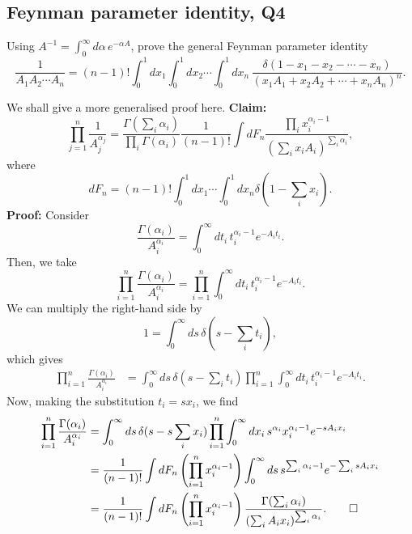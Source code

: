\subsection{Feynman parameter identity, Q4}
Using $A^{-1} = \int_0^\infty d\alpha\,e^{-\alpha A}$, prove the general Feynman parameter identity
\begin{equation}
    \frac{1}{A_1 A_2\cdots A_n} = (n-1)!\int_0^1 dx_1\int_0^1 dx_2\cdots\int_0^1 dx_n\,\frac{\delta(1 - x_1 - x_2 - \cdots - x_n)}{(x_1 A_1 + x_2 A_2 + \cdots + x_n A_n)^n}.
\end{equation}
\begin{solution}
    We shall give a more generalised proof here.
    \noindent\textbf{Claim:}
\begin{equation}
    \prod_{j=1}^n\frac{1}{A_j^{\alpha_j}} = \frac{\Gamma(\sum_i\alpha_i)}{\prod_i\Gamma(\alpha_i)}\frac{1}{(n-1)!}\int dF_n \frac{\prod_ix_i^{\alpha_i-1}}{(\sum_ix_iA_i)^{\sum_i\alpha_i}},
\end{equation}
where
\begin{equation}
    dF_n = (n-1)!\int_0^1dx_1\cdots\int^1_0 dx_n \delta(1-\sum_ix_i).
\end{equation}
\noindent\textbf{Proof:}
Consider
\begin{equation}
    \frac{\Gamma(\alpha_i)}{A_i^{\alpha_i}} = \int_0^\infty dt_i\, t_i^{\alpha_i-1}e^{-A_it_i}.
\end{equation}
Then, we take
\begin{equation}
    \prod_{i=1}^n \frac{\Gamma(\alpha_i)}{A_i^{\alpha_i}} = \prod_{i=1}^n\int_0^\infty dt_i\, t_i^{\alpha_i-1}e^{-A_it_i}.
\end{equation}
We can multiply the right-hand side by
\begin{equation}
    1 = \int^\infty_0ds\,\delta(s-\sum_it_i),
\end{equation}
which gives
\begin{equation}
\begin{aligned}
    \prod_{i=1}^n \frac{\Gamma(\alpha_i)}{A_i^{\alpha_i}} &= \int^\infty_0ds\,\delta(s-\sum_it_i)\prod_{i=1}^n\int_0^\infty dt_i\, t_i^{\alpha_i-1}e^{-A_it_i}.
\end{aligned}
\end{equation}
Now, making the substitution $t_i =sx_i$, we find
\begin{equation}
\begin{aligned}
    \prod_{i=1}^n \frac{\Gamma(\alpha_i)}{A_i^{\alpha_i}} &= \int^\infty_0ds\,\delta(s-s\sum_ix_i)\prod_{i=1}^n\int_0^\infty dx_i\, s^{\alpha_i}x_i^{\alpha_i-1}e^{-sA_ix_i}\\
    &=\frac{1}{(n-1)!}\int dF_n\left(\prod_{i=1}^nx_i^{\alpha_i-1}\right)\int ^\infty_0 ds\,s^{\sum_i \alpha_i -1}e^{-\sum_isA_ix_i}\\
    &=\frac{1}{(n-1)!}\int dF_n\left(\prod_{i=1}^nx_i^{\alpha_i-1}\right)\frac{\Gamma(\sum_i\alpha_i)}{(\sum_iA_ix_i)^{\sum_i\alpha_i}}.\qed
\end{aligned}
\end{equation}
\end{solution}



